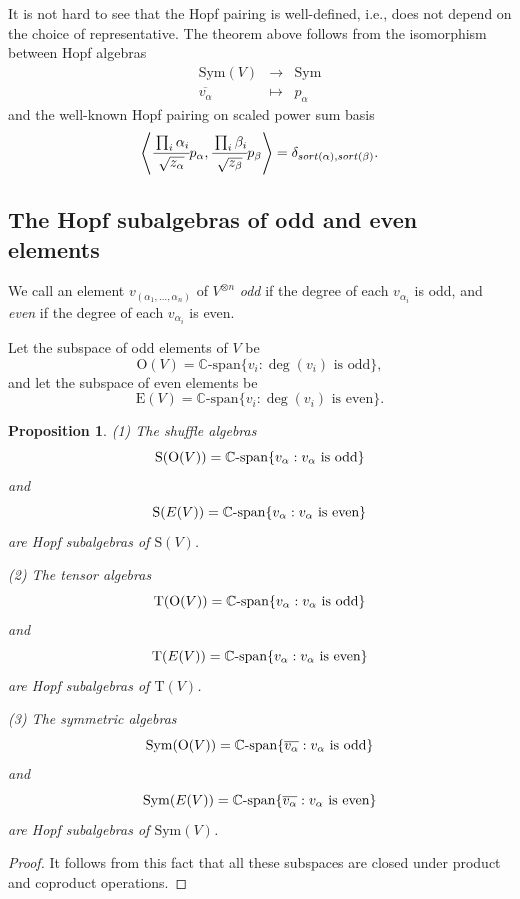 \documentclass[12pt]{amsart}
\newtheorem{proposition}[theorem]{Proposition}
\numberwithin{equation}{section}
\newcommand{\Sym}{\mathrm{Sym}}
\newcommand{\rmO}{\mathrm{O}}
\newcommand{\rmT}{\mathrm{T}}
\newcommand{\rmS}{\mathrm{S}}
\newcommand{\rmE}{\mathrm{E}}
\begin{document}
It is not hard to see that the Hopf pairing is well-defined, i.e., does not depend on the choice of representative. The theorem above follows from the isomorphism between  Hopf algebras
$$\begin{array}{ccc}
\Sym(V) & \to & \Sym\\
\overline{v_\alpha} & \mapsto & p_\alpha
\end{array}$$
and the well-known Hopf pairing on scaled power sum basis
$$\left\langle \cfrac{\prod_i\alpha_i}{\sqrt{z_\alpha}}p_\alpha,\cfrac{\prod_i\beta_i}{\sqrt{z_\beta}}p_\beta \right\rangle=\delta_{{\rm sort}(\alpha),{\rm sort}(\beta)}.$$

\subsection{The Hopf subalgebras of odd and even elements}

We call an element 
$v_{(\alpha_1,\dots,\alpha_n)}$ of $V^{\otimes n}$ {\it odd} if the degree of each $v_{\alpha_i}$ is odd, and {\it even} if the degree of each $v_{\alpha_i}$ is even.

Let the subspace of odd elements of $V$ be
$$\rmO(V)=\mathbb{C}\text{-span}\{v_i: \deg(v_i)\text{~is odd}  \},$$
and let the subspace of even elements be
$$\rmE(V)=\mathbb{C}\text{-span}\{v_i: \deg(v_i)\text{~is even}  \}.$$

\begin{proposition}
	(1) The shuffle algebras
	$$\rmS(\rmO(V))=\mathbb{C}\text{\rm-span}\{v_\alpha: v_\alpha \text{~is odd}  \}$$
	and
	$$\rmS({\rm E}(V))=\mathbb{C}\text{\rm-span}\{v_\alpha: v_\alpha \text{~is even}  \}$$ 
	are Hopf subalgebras of $\rmS(V)$.
	
	(2) The tensor algebras
	$$\rmT(\rmO(V))=\mathbb{C}\text{\rm-span}\{v_\alpha: v_\alpha \text{~is odd}  \}$$
	and
	$$\rmT({\rm E}(V))=\mathbb{C}\text{\rm-span}\{v_\alpha: v_\alpha \text{~is even}  \}$$ 
	are Hopf subalgebras of $\rmT(V)$.
	
	(3) The symmetric algebras
	$$\Sym(\rmO(V))=\mathbb{C}\text{\rm-span}\{\overline{v_\alpha}: v_\alpha \text{~is odd}  \}$$
	and
	$$\Sym({\rm E}(V))=\mathbb{C}\text{\rm-span}\{\overline{v_\alpha}: v_\alpha \text{~is even}  \}$$ 
	are Hopf subalgebras of $\Sym(V)$.
\end{proposition} 
\begin{proof}
	It follows from this fact that all these subspaces are closed under product and coproduct operations.
\end{proof} 
\end{document}
